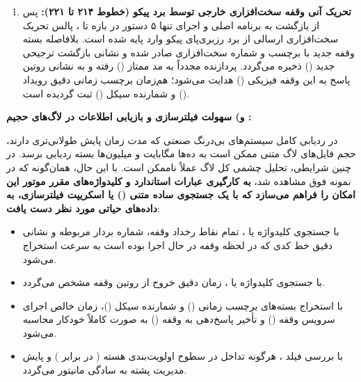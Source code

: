 \begin{enumerate}
    \item \textbf{تحریک آنی وقفه سخت‌افزاری خارجی  توسط برد پیکو (خطوط ۲۱۴ تا ۲۲۱):}
    پس از بازگشت به برنامه اصلی و اجرای تنها ۵ دستور در بازه  تا ، پالس تحریک سخت‌افزاری ارسالی از برد رزبری‌پای پیکو وارد پایه  شده است. بلافاصله بسته وقفه جدید با برچسب  و شماره سخت‌افزاری  صادر شده و نشانی بازگشت ترجیحی جدید () ذخیره می‌گردد. پردازنده مجدداً به مد ممتاز () رفته و به نشانی روتین پاسخ به این وقفه فیزیکی () هدایت می‌شود؛ هم‌زمان برچسب زمانی دقیق رویداد () و شمارنده سیکل () ثبت گردیده است.
\end{enumerate}

\vspace{0.4cm}
\noindent
\textbf{و) سهولت فیلترسازی و بازیابی اطلاعات در لاگ‌های حجیم :}\par
در ردیابی کامل سیستم‌های بی‌درنگ صنعتی که مدت زمان پایش طولانی‌تری دارند، حجم فایل‌های لاگ متنی ممکن است به ده‌ها مگابایت و میلیون‌ها بسته ردیابی برسد. در چنین شرایطی، تحلیل چشمی کل لاگ عملاً ناممکن است. با این حال، همان‌گونه که در نمونه فوق مشاهده شد، \textbf{به کارگیری عبارات استاندارد و کلیدواژه‌های مقرر موتور  این امکان را فراهم می‌سازد که با یک جستجوی ساده متنی () یا اسکریپت فیلترسازی، به داده‌های حیاتی مورد نظر دست یافت}:
\begin{itemize}
    \item با جستجوی کلیدواژه  یا ، تمام نقاط رخداد وقفه، شماره بردار مربوطه و نشانی دقیق خط کدی که در لحظه وقفه در حال اجرا بوده است به سرعت استخراج می‌شود.
    \item با جستجوی کلیدواژه  یا ، زمان دقیق خروج از روتین وقفه مشخص می‌گردد.
    \item با استخراج بسته‌های برچسب زمانی () و شمارنده سیکل ()، زمان خالص اجرای سرویس وقفه () و تأخیر پاسخ‌دهی به وقفه () به صورت کاملاً خودکار محاسبه می‌شود.
    \item با بررسی فیلد ، هرگونه تداخل در سطوح اولویت‌بندی هسته ( در برابر ) و پایش مدیریت پشته به سادگی مانیتور می‌گردد.
\end{itemize}

